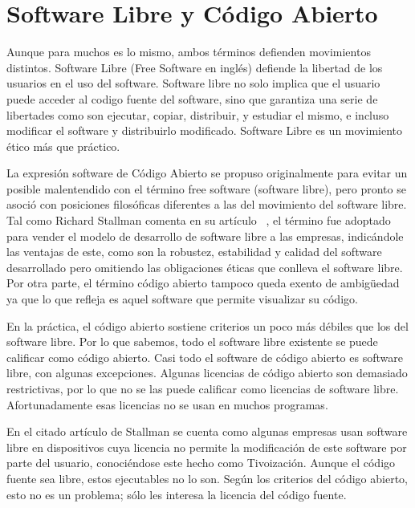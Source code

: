 \chapter{Software Libre y Código Abierto}

Aunque para muchos es lo mismo, ambos términos defienden movimientos distintos. Software Libre (Free Software en inglés) defiende la libertad de los usuarios en el uso del software. Software libre no solo implica que el usuario puede acceder al codigo fuente del software, sino que garantiza una serie de libertades como son ejecutar, copiar, distribuir, y estudiar el mismo, e incluso modificar el software y distribuirlo modificado. Software Libre es un movimiento ético más que práctico.

La expresión software de Código Abierto se propuso originalmente para evitar un posible malentendido con el término free software (software libre), pero pronto se asoció con posiciones filosóficas diferentes a las del movimiento del software libre. Tal como Richard Stallman comenta en su artículo ~\cite{StallmanFreeSoftware}, el término fue adoptado para vender el modelo de desarrollo de software libre a las empresas, indicándole las ventajas de este, como son la robustez, estabilidad y calidad del software desarrollado pero omitiendo las obligaciones éticas que conlleva el software libre. Por otra parte, el término código abierto tampoco queda exento de ambigüedad ya que lo que refleja es aquel software que permite visualizar su código. 

En la práctica, el código abierto sostiene criterios un poco más débiles que los del software libre. Por lo que sabemos, todo el software libre existente se puede calificar como código abierto. Casi todo el software de código abierto es software libre, con algunas excepciones. Algunas licencias de código abierto son demasiado restrictivas, por lo que no se las puede calificar como licencias de software libre. Afortunadamente esas licencias no se usan en muchos programas.

En el citado artículo de Stallman se cuenta como algunas empresas usan software libre en dispositivos cuya licencia no permite la modificación de este software por parte del usuario, conociéndose este hecho como Tivoización. Aunque el código fuente sea libre, estos ejecutables no lo son. Según los criterios del código abierto, esto no es un problema; sólo les interesa la licencia del código fuente.


